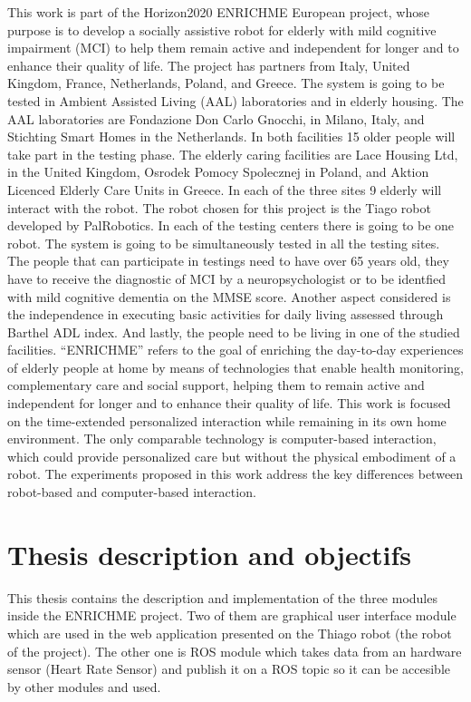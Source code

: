This work is part of the Horizon2020 ENRICHME European
project, whose purpose is to develop a socially assistive
robot for elderly with mild cognitive impairment (MCI) to
help them remain active and independent for longer and
to enhance their quality of life. The project has partners
from Italy, United Kingdom, France, Netherlands, Poland,
and Greece. The system is going to be tested in Ambient
Assisted Living (AAL) laboratories and in elderly housing.
The AAL laboratories are Fondazione Don Carlo Gnocchi, in
Milano, Italy, and Stichting Smart Homes in the Netherlands.
In both facilities 15 older people will take part in the testing
phase. The elderly caring facilities are Lace Housing Ltd, in
the United Kingdom, Osrodek Pomocy Spolecznej in Poland,
and Aktion Licenced Elderly Care Units in Greece. In each
of the three sites 9 elderly will interact with the robot. The
robot chosen for this project is the Tiago
robot developed
by PalRobotics. In each of the testing centers there is going
to be one robot. The system is going to be simultaneously
tested in all the testing sites. The people that can participate
in testings need to have over 65 years old, they have to
receive the diagnostic of MCI by a neuropsychologist or to
be identfied with mild cognitive dementia on the MMSE
score. Another aspect considered is the independence in
executing basic activities for daily living assessed through
Barthel ADL index. And lastly, the people need to be living
in one of the studied facilities.
“ENRICHME” refers to the goal of enriching the day-to-day experiences of 
elderly people at home by means of technologies that enable health monitoring, complementary care and
social support, helping them to remain active and independent for longer and to enhance their quality of life. 
This work is focused on the time-extended personalized interaction while remaining in its own home
environment.  The only comparable technology is computer-based interaction, which could provide
personalized care but without the physical embodiment of a robot. The experiments proposed in this work
address the key differences between robot-based and computer-based interaction. 
\cite{agrigoroaie2016developing}



\section{Thesis description and objectifs}
This thesis contains the description and implementation of the three modules inside the ENRICHME project.
Two of them are graphical user interface module which are used in the web application presented on the
Thiago robot (the robot of the project). The other one is ROS module which takes data from an hardware
sensor (Heart Rate Sensor) and publish it on a ROS topic so it can be accesible by other modules and used.

